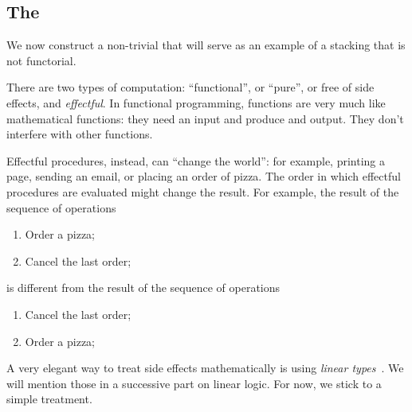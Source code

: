 %

\subsection{The  \Effects}

We now construct a non-trivial  that will serve as an example of a stacking  that is not functorial.

There are two types of computation: ``functional'', or ``pure'', or free of side effects, and \emph{effectful}.
In functional programming, functions are very much like mathematical functions: they need an input and produce and output.
They don't interfere with other functions.

Effectful procedures,  instead, can ``change the world'': for example, printing a page, sending an email, or placing an order of pizza.
The order in which effectful procedures are evaluated might change the result.
For example, the result of the sequence of operations
%
\begin{enumerate}
    \item Order a pizza;
    \item Cancel the last order;
\end{enumerate}
%
is different from the result of the sequence of operations
%
\begin{enumerate}
    \item Cancel the last order;
    \item Order a pizza;
\end{enumerate}

A very elegant way to treat side effects mathematically is using \emph{linear types}~\cite{Wadler90lineartypes}.
We will mention those in a successive part on linear logic.
For now, we stick to a simple treatment.

\begin{marginfigure}
    \centering
    \\
    \caption{}
    \label{fig:effects12}
\end{marginfigure}

